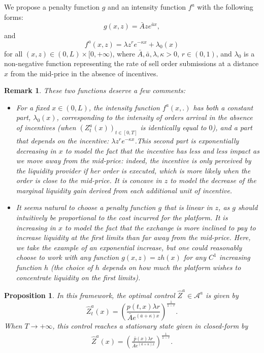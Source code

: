 \documentclass[11pt]{article}
\newtheorem{prop}{Proposition}
\newtheorem{rem}{Remark}
\begin{document}
We propose a penalty function $g$ and an intensity function $f^a$ with the following forms:
$$g(x,z) = \bar A ze^{\bar a x},$$
and
$$f^a (x,z) =  \lambda z^r e^{-\kappa x} + \lambda_0(x)$$
for all $(x,z) \in  (0,L) \times [0,+\infty)$, where $\bar A, \bar a, \lambda, \kappa >0$, $r \in (0,1)$, and $\lambda_0$ is a non-negative function representing the rate of sell order submissions at a distance $x$ from the mid-price in the absence of incentives.\\

\begin{rem}
These two functions deserve a few comments:
\begin{itemize}
    \item For a fixed $x \in (0,L)$, the intensity function $f^a(x,.)$ has both a constant part, $\lambda_0(x)$, corresponding to the intensity of orders arrival in the absence of incentives (when $\left(Z^a_t(x)\right)_{t\in [0,T]}$ is identically equal to $0$), and a part that depends on the incentive: $\lambda z^r e^{-\kappa x}$.This second part is exponentially decreasing in $x$ to model the fact that the incentive has less and less impact as we move away from the mid-price: indeed, the incentive is only perceived by the liquidity provider if her order is executed, which is more likely when the order is close to the mid-price. It is concave in $z$ to model the decrease of the marginal liquidity gain derived from each additional unit of incentive.
    \item It seems natural to choose a penalty function $g$ that is linear in $z$, as $g$ should intuitively be proportional to the cost incurred for the platform. It is increasing in $x$ to model the fact that the exchange is more inclined to pay to increase liquidity at the first limits than far away from the mid-price. Here, we take the example of an exponential increase, but one could reasonably choose to work with any function $g(x,z) = z h(x)$ for any $C^1$ increasing function $h$ (the choice of $h$ depends on how much the platform wishes to concentrate liquidity on the first limits).
\end{itemize}
\end{rem}

\begin{prop}
In this framework, the optimal control $\hat Z^a \in \mathcal A^a$ is given by
$$\hat Z^a_t(x) = \left( \frac{p(t,x) \lambda r}{\bar A e^{(\bar a + \kappa )x}} \right)^{\frac 1{1-r}}.$$
When $T \rightarrow +\infty$, this control reaches a stationary state given in closed-form by
\begin{align}\label{closed}
   \hat Z^a(x) = \left( \frac{\bar p(x) \lambda r}{\bar A e^{(\bar a + \kappa )x}} \right)^{\frac 1{1-r}}.
\end{align}
\end{prop}
\end{document}
